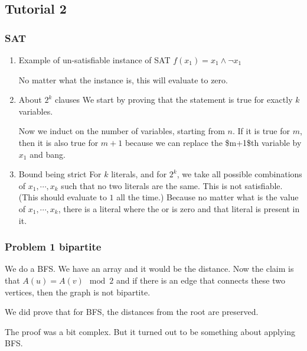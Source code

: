 \documentclass[11pt]{article}
\begin{document}
\subsection{Tutorial 2}
\label{sec:org1c0445d}
\subsubsection{SAT}
\label{sec:org68ef676}
\begin{enumerate}
\item Example of un-satisfiable instance of SAT
\label{sec:org5abf13e}
\(f(x_1) = x_1 \wedge \neg x_1\)

No matter what the instance is, this will evaluate to zero. 
\item About \(2^k\) clauses
\label{sec:orgcd55c3a}
We start by proving that the statement is true for exactly \(k\) variables. 

Now we induct on the number of variables, starting from \(n\). If it is true
for \(m\), then it is also true for \(m+1\) because we can replace the \$m+1\$th
variable by \(x_1\) and bang.
\item Bound being strict
\label{sec:org8fdd516}
For \(k\) literals, and for \(2^k\), we take all possible combinations of \(x_1,
     \cdots, x_k\) such that no two literals are the same. This is not
satisfiable. (This should evaluate to \(1\) all the time.) Because no matter
what is the value of \(x_1, \cdots, x_k\), there is a literal where the or is
zero and that literal is present in it.
\end{enumerate}
\subsubsection{Problem 1 bipartite}
\label{sec:org7e228ac}
We do a BFS. We have an array and it would be the distance. Now the claim is
that \(A(u) = A(v) \mod 2\) and if there is an edge that connects these two
vertices, then the graph is not bipartite.

We did prove that for BFS, the distances from the root are preserved.

The proof was a bit complex. But it turned out to be something about
applying BFS.
\end{document}

